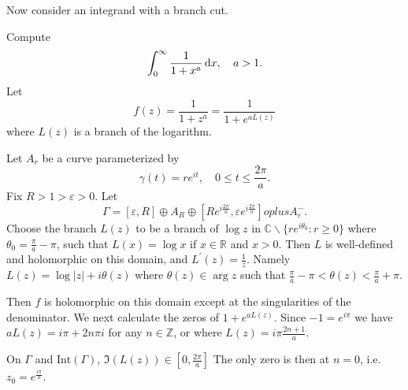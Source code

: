 Now consider an integrand with a branch cut.
\begin{xmpl}
  Compute
  $$
    \int_0^\infty
      \frac{1}{1 + x^a}
      \mathop{}\!\mathrm{d} x, \quad
    a > 1.
  $$
  Let
  $$
    f(z)
  = \frac{1}{1 + z^a}
  = \frac{1}{1 + e^{a L(z)}}
  $$
  where $L(z)$ is a branch of the logarithm.

  Let $A_r$ be a curve parameterized by
  $$
  \gamma(t) = r e^{it}, \quad 0 \leq t \leq \frac{2 \pi}{a}.
  $$
  Fix $R > 1 > \varepsilon > 0$. Let
  $$
    \Gamma
  =      [\varepsilon, R]
  \oplus A_R
  \oplus [R e^{i \frac{2 \pi}{a}}, \varepsilon e^{i \frac{2 \pi}{a}}]
  oplus  A_\varepsilon^{-}.
  $$
  Choose the branch $L(z)$ to be a branch of $\log z$ in
  $\mathbb{C} \backslash \{ r e^{i \theta_0} : r \geq 0 \}$
  where $\theta_0 = \frac{\pi}{a} - \pi$, such that
  $L(x) = \log x$ if $x \in \mathbb{R}$ and $x > 0$. Then
  $L$ is well-defined and holomorphic on this domain, and
  $L^\prime(z) = \frac{1}{z}$. Namely
  $L(z) = \log |z| + i \theta(z)$ where
  $\theta(z) \in \arg z$ such that
  $\frac{\pi}{a} - \pi < \theta(z) < \frac{\pi}{a} + \pi$.

  Then $f$ is holomorphic on
  this domain except at the singularities of the denominator.
  We next calculate the zeros of $1 + e^{a L(z)}$. Since
  $-1 = e^{i \pi}$ we have $a L(z) = i \pi + 2 n \pi i$ for any
  $n \in \mathbb{Z}$, or where $L(z) = i \pi \frac{2n + 1}{a}$.

  On $\Gamma$ and $\mathrm{Int}(\Gamma)$,
  $\Im(L(z)) \in \left[0, \frac{2 \pi}{a}\right]$ The only zero
  is then at $n = 0$, i.e. $z_0 = e^{\frac{i \pi}{a}}$.


\end{xmpl}

